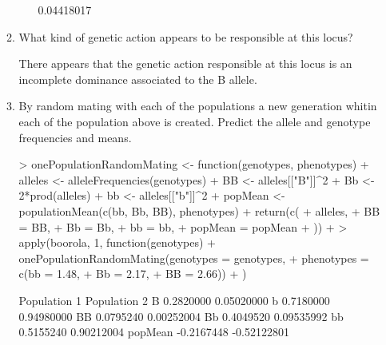 \documentclass[12pt,a4paper]{paper}
\begin{document}
\begin{enumerate}
\begin{enumerate}
\begin{itemize}
\begin{Schunk}
\begin{Soutput}
[1] 0.04418017
\end{Soutput}
\end{Schunk}
\end{itemize}
\item What kind of genetic action appears to be responsible at this locus?
\begin{center}
\end{center}
There appears that the genetic action responsible at this locus is an incomplete dominance associated to the B allele.
\item By random mating with each of the populations a new generation whitin each of the population above is created. Predict the allele and genotype frequencies and means.
\begin{Schunk}
\begin{Sinput}
> onePopulationRandomMating <- function(genotypes, phenotypes) {
+   alleles <- alleleFrequencies(genotypes)
+   BB <- alleles[["B"]]^2
+   Bb <- 2*prod(alleles)
+   bb <- alleles[["b"]]^2
+   popMean <- populationMean(c(bb, Bb, BB), phenotypes)
+   return(c(
+   alleles,
+   BB = BB,
+   Bb = Bb,
+   bb = bb,
+   popMean = popMean
+   ))
+ }
> apply(boorola, 1, function(genotypes) {
+ onePopulationRandomMating(genotypes = genotypes,
+ phenotypes = c(bb = 1.48,
+ Bb = 2.17,
+ BB = 2.66))
+ })
\end{Sinput}
\begin{Soutput}
        Population 1 Population 2
B          0.2820000   0.05020000
b          0.7180000   0.94980000
BB         0.0795240   0.00252004
Bb         0.4049520   0.09535992
bb         0.5155240   0.90212004
popMean   -0.2167448  -0.52122801
\end{Soutput}

\end{Schunk}
\end{enumerate}
\end{enumerate}
\end{document}
